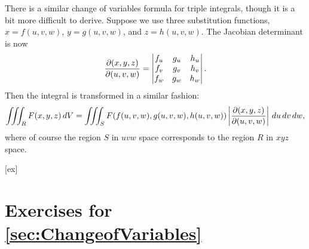 There is a similar change of variables formula for triple integrals,
though it is a bit more difficult to derive.
Suppose we use three substitution functions, $x=f(u,v,w)$,
$y=g(u,v,w)$, and $z=h(u,v,w)$.  The Jacobian determinant is now
\[
  {\partial(x,y,z)\over\partial(u,v,w)} =  
  \left|\begin{matrix}	f_u	&	g_u	&	h_u	\\
  						f_v	&	g_v	&	h_v	\\
  						f_w	&	g_w	&	h_w
  		\end{matrix}\right|.
\]
Then the integral is transformed in a similar fashion:
\[
  \iiint_R F(x,y,z) \, dV = 
  \iiint_S F(f(u,v,w),g(u,v,w),h(u,v,w)) 
  \left|{\partial(x,y,z)\over\partial(u,v,w)}\right| \,du\,dv\,dw,
\]
where of course the region $S$ in $uvw$ space corresponds to the
region $R$ in $xyz$ space.


[ex]
\section*{Exercises for \ref{sec:ChangeofVariables}}

